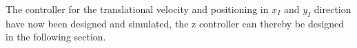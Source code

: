 \begin{minipage}{\linewidth}
\begin{minipage}{0.46\linewidth}
\begin{figure}[H]
            \centering
            \label{fig:positionControllersXYAction}
        \end{figure}
    \end{minipage}
\end{minipage}

The controller for the translational velocity and positioning in $x_I$ and $y_I$ direction have now been designed and simulated, the z controller can thereby be designed in the following section.
